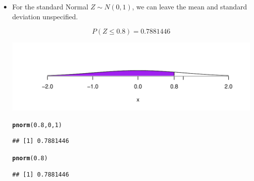 \documentclass[t,xcolor=pdftex,dvipsnames,table]{beamer}
\makeatletter
\def\maxwidth{ %
  \ifdim\Gin@nat@width>\linewidth
    \linewidth
  \else
    \Gin@nat@width
  \fi
}
\newcommand{\hlnum}[1]{\textcolor[rgb]{0.686,0.059,0.569}{#1}}%
\newcommand{\hlstd}[1]{\textcolor[rgb]{0.345,0.345,0.345}{#1}}%
\newcommand{\hlkwd}[1]{\textcolor[rgb]{0.737,0.353,0.396}{\textbf{#1}}}%
\newenvironment{kframe}{%
 \def\at@end@of@kframe{}%
 \ifinner\ifhmode%
  \def\at@end@of@kframe{\end{minipage}}%
  \begin{minipage}{\columnwidth}%
 \fi\fi%
 \def\FrameCommand##1{\hskip\@totalleftmargin \hskip-\fboxsep
 \colorbox{shadecolor}{##1}\hskip-\fboxsep
     \hskip-\linewidth \hskip-\@totalleftmargin \hskip\columnwidth}%
 \MakeFramed {\advance\hsize-\width
   \@totalleftmargin\z@ \linewidth\hsize
   \@setminipage}}%
 {\par\unskip\endMakeFramed%
 \at@end@of@kframe}
\newenvironment{knitrout}{}{} %
\makeatother
\begin{document}
\begin{frame}[fragile]
\begin{itemize}
\item
For the standard Normal $Z \sim N(0,1)$, we can leave the mean and standard deviation unspecified.

\[ P(Z \leq 0.8)  = 0.7881446 \]

\begin{knitrout}
\color{fgcolor}
\includegraphics[width=\maxwidth]{figure/unnamed-chunk-14-1} 

\end{knitrout}

\begin{knitrout}
\color{fgcolor}\begin{kframe}
\begin{alltt}
\hlkwd{pnorm}\hlstd{(}\hlnum{0.8}\hlstd{,}\hlnum{0}\hlstd{,}\hlnum{1}\hlstd{)}
\end{alltt}
\begin{verbatim}
## [1] 0.7881446
\end{verbatim}
\begin{alltt}
\hlkwd{pnorm}\hlstd{(}\hlnum{0.8}\hlstd{)}
\end{alltt}
\begin{verbatim}
## [1] 0.7881446
\end{verbatim}
\end{kframe}
\end{knitrout}

\end{itemize}
\end{frame}
\end{document}
